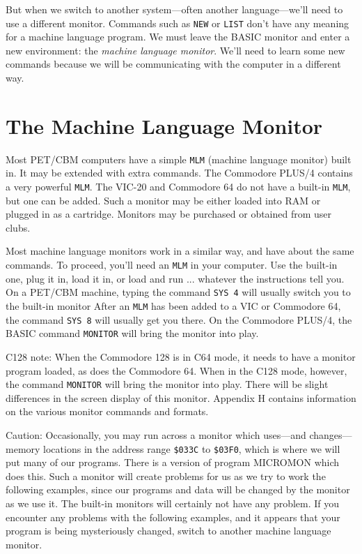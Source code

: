 \documentclass[11pt,a4paper,titlepage]{memoir}
\begin{document}
But when we switch to another system—often another language—we'll
need to use a different monitor. Commands such as \texttt{NEW} or \texttt{LIST} don't
have any meaning for a machine language program. We must leave the
BASIC monitor and enter a new environment: the \emph{machine language monitor}. We'll need to learn some new commands because we will be communicating with the computer in a different way.

\section{The Machine Language Monitor}
Most PET/CBM computers have a simple \texttt{MLM} (machine language monitor) 
built in. It may be extended with extra commands. The Commodore
PLUS/4 contains a very powerful \texttt{MLM}. The VIC-20 and Commodore 64
do not have a built-in \texttt{MLM}, but one can be added. Such a monitor may
be either loaded into RAM or plugged in as a cartridge. Monitors may be
purchased or obtained from user clubs.

Most machine language monitors work in a similar way, and have about
the same commands. To proceed, you'll need an \texttt{MLM} in your computer.
Use the built-in one, plug it in, load it in, or load and run ... whatever the
instructions tell you. On a PET/CBM machine, typing the command \texttt{SYS
4} will usually switch you to the built-in monitor After an \texttt{MLM} has been
added to a VIC or Commodore 64, the command \texttt{SYS 8} will usually get
you there. On the Commodore PLUS/4, the BASIC command \texttt{MONITOR}
will bring the monitor into play.

C128 note: When the Commodore 128 is in C64 mode, it needs to have
a monitor program loaded, as does the Commodore 64. When in the C128
mode, however, the command \texttt{MONITOR} will bring the monitor into play.
There will be slight differences in the screen display of this monitor.
Appendix H contains information on the various monitor commands and
formats.

Caution: Occasionally, you may run across a monitor which uses—and
changes—memory locations in the address range \texttt{\$033C} to \texttt{\$03F0},
which is where we will put many of our programs. There is a version of
program MICROMON which does this. Such a monitor will create problems
for us as we try to work the following examples, since our programs and
data will be changed by the monitor as we use it. The built-in monitors
will certainly not have any problem. If you encounter any problems with
the following examples, and it appears that your program is being mysteriously
changed, switch to another machine language monitor.
\end{document}
